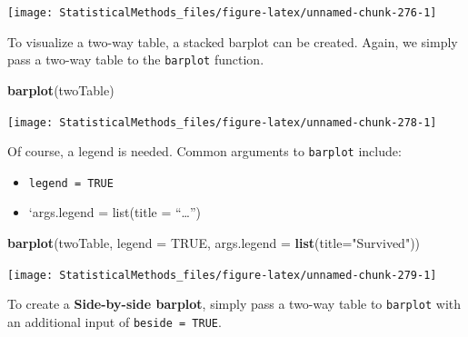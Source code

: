 \documentclass[
]{book}
\newenvironment{Shaded}{\begin{snugshade}}{\end{snugshade}}
\newcommand{\DataTypeTok}[1]{\textcolor[rgb]{0.13,0.29,0.53}{#1}}
\newcommand{\KeywordTok}[1]{\textcolor[rgb]{0.13,0.29,0.53}{\textbf{#1}}}
\newcommand{\NormalTok}[1]{#1}
\newcommand{\OperatorTok}[1]{\textcolor[rgb]{0.81,0.36,0.00}{\textbf{#1}}}
\newcommand{\OtherTok}[1]{\textcolor[rgb]{0.56,0.35,0.01}{#1}}
\newcommand{\StringTok}[1]{\textcolor[rgb]{0.31,0.60,0.02}{#1}}
\providecommand{\tightlist}{%
  \setlength{\itemsep}{0pt}\setlength{\parskip}{0pt}}
\theoremstyle{definition}
\theoremstyle{definition}
\theoremstyle{definition}
\theoremstyle{remark}
\begin{document}
\begin{center}\texttt{[image: StatisticalMethods\_files/figure-latex/unnamed-chunk-276-1]} \end{center}

To visualize a two-way table, a stacked barplot can be created. Again, we simply pass a two-way table to the \texttt{barplot} function.

\begin{Shaded}
\end{Shaded}

\begin{Shaded}
\begin{Highlighting}[]
\KeywordTok{barplot}\NormalTok{(twoTable)}
\end{Highlighting}
\end{Shaded}

\begin{center}\texttt{[image: StatisticalMethods\_files/figure-latex/unnamed-chunk-278-1]} \end{center}

Of course, a legend is needed. Common arguments to \texttt{barplot} include:

\begin{itemize}
\tightlist
\item
  \texttt{legend\ =\ TRUE}
\item
  `args.legend = list(title = ``\ldots{}'')
\end{itemize}

\begin{Shaded}
\begin{Highlighting}[]
\KeywordTok{barplot}\NormalTok{(twoTable, }\DataTypeTok{legend =} \OtherTok{TRUE}\NormalTok{, }\DataTypeTok{args.legend =} \KeywordTok{list}\NormalTok{(}\DataTypeTok{title=}\StringTok{"Survived"}\NormalTok{))}
\end{Highlighting}
\end{Shaded}

\begin{center}\texttt{[image: StatisticalMethods\_files/figure-latex/unnamed-chunk-279-1]} \end{center}

To create a \textbf{Side-by-side barplot}, simply pass a two-way table to \texttt{barplot} with an additional input of \texttt{beside\ =\ TRUE}.
\end{document}
